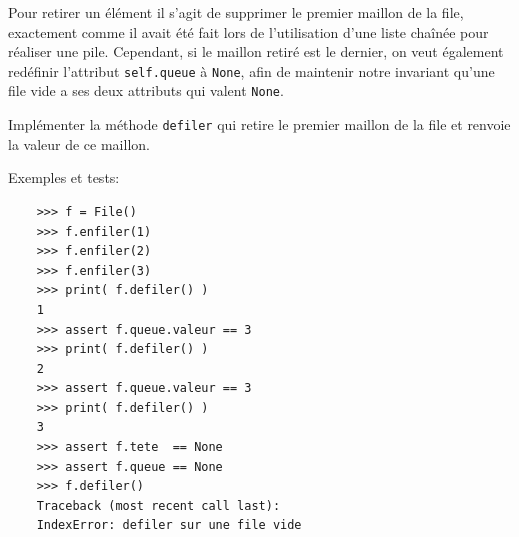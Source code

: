 \documentclass[a4paper,17pt]{extarticle}
\begin{document}
    Pour retirer un élément il s'agit de supprimer le premier maillon de la
file, exactement comme il avait été fait lors de l'utilisation d'une
liste chaînée pour réaliser une pile. Cependant, si le maillon retiré
est le dernier, on veut également redéfinir l'attribut
\texttt{self.queue} à \texttt{None}, afin de maintenir notre invariant
qu'une file vide a ses deux attributs qui valent \texttt{None}.

    Implémenter la méthode \texttt{defiler} qui retire le premier maillon de
la file et renvoie la valeur de ce maillon.

Exemples et tests:

\begin{verbatim}
    >>> f = File()
    >>> f.enfiler(1)
    >>> f.enfiler(2)
    >>> f.enfiler(3)
    >>> print( f.defiler() )
    1
    >>> assert f.queue.valeur == 3
    >>> print( f.defiler() )
    2
    >>> assert f.queue.valeur == 3
    >>> print( f.defiler() )
    3
    >>> assert f.tete  == None
    >>> assert f.queue == None
    >>> f.defiler()
    Traceback (most recent call last):
    IndexError: defiler sur une file vide
\end{verbatim}
\end{document}
